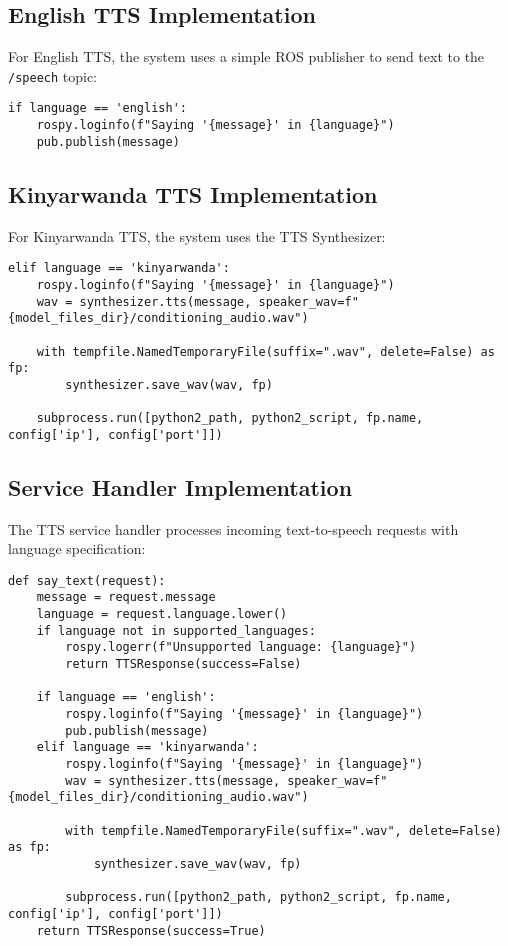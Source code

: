 \documentclass{CSSRforAfrica}
\begin{document}
\subsection{English TTS Implementation}

For English TTS, the system uses a simple ROS publisher to send text to the \texttt{/speech} topic:

\begin{lstlisting}[style=commandstyle]
if language == 'english':
    rospy.loginfo(f"Saying '{message}' in {language}")
    pub.publish(message)
\end{lstlisting}

\newpage

\subsection{Kinyarwanda TTS Implementation}

For Kinyarwanda TTS, the system uses the TTS Synthesizer:

\begin{lstlisting}[style=commandstyle]
elif language == 'kinyarwanda':
    rospy.loginfo(f"Saying '{message}' in {language}")
    wav = synthesizer.tts(message, speaker_wav=f"{model_files_dir}/conditioning_audio.wav")
    
    with tempfile.NamedTemporaryFile(suffix=".wav", delete=False) as fp:
        synthesizer.save_wav(wav, fp)
    
    subprocess.run([python2_path, python2_script, fp.name, config['ip'], config['port']])
\end{lstlisting}

\subsection{Service Handler Implementation}

The TTS service handler processes incoming text-to-speech requests with language specification:

\begin{lstlisting}[style=commandstyle]
def say_text(request):
    message = request.message
    language = request.language.lower()
    if language not in supported_languages:
        rospy.logerr(f"Unsupported language: {language}")
        return TTSResponse(success=False)
    
    if language == 'english':
        rospy.loginfo(f"Saying '{message}' in {language}")
        pub.publish(message)
    elif language == 'kinyarwanda':
        rospy.loginfo(f"Saying '{message}' in {language}")
        wav = synthesizer.tts(message, speaker_wav=f"{model_files_dir}/conditioning_audio.wav")
        
        with tempfile.NamedTemporaryFile(suffix=".wav", delete=False) as fp:
            synthesizer.save_wav(wav, fp)
        
        subprocess.run([python2_path, python2_script, fp.name, config['ip'], config['port']])
    return TTSResponse(success=True)
\end{lstlisting}
\end{document}
